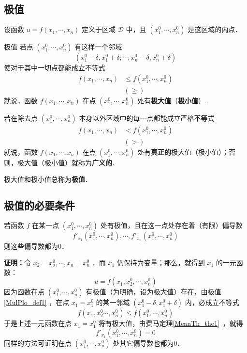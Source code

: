 

\subsection{极值}
设函数 $u=f(x_1,\cdots,x_n)$ 定义于区域 $\mathcal{D}$ 中，且 $(x_1^0,\cdots,x_n^0)$ 是这区域的内点．

\begin{definition}{极值}\label{MulPlo_def1}
若点 $(x_1^0,\cdots,x_n^0)$ 有这样一个邻域
\[(x_1^0-\delta,x_1^0+\delta;\cdots;x_n^0-\delta,x_n^0+\delta)\]
使对于其中一切点都能成立不等式
\begin{equation}
\begin{aligned}
f(x_1,\cdots,x_n)&\leq f(x_1^0,\cdots,x_n^0)\\
&(\geq)
\end{aligned}
\end{equation}
就说，函数 $f(x_1,\cdots,x_n)$ 在点 $(x_1^0,\cdots,x_n^0)$ 处有\textbf{极大值}（\textbf{极小值}）.

若在除去点 $(x_1^0,\cdots,x_n^0)$ 本身以外区域中的每一点都能成立严格不等式
\begin{equation}
\begin{aligned}
f(x_1,\cdots,x_n)&< f(x_1^0,\cdots,x_n^0)\\
&(>)
\end{aligned}
\end{equation}
就说，函数 $f(x_1,\cdots,x_n)$ 在点 $(x_1^0,\cdots,x_n^0)$ 处有\textbf{真正的}极大值（极小值）；否则，极大值（极小值）就称为\textbf{广义的}．

极大值和极小值总称为\textbf{极值}．
\end{definition}
\subsection{极值的必要条件}
\begin{theorem}{}
若函数 $f$ 在某一点 $(x_1^0,\cdots,x_n^0)$ 处有极值，且在这一点处存在着（有限）偏导数
\[f'_{x_1}(x_1^0,\cdots,x_n^0),\cdots,f'_{x_n}(x_1^0,\cdots,x_n^0)\]
则这些偏导数都为0．
\end{theorem}
\textbf{证明：}令 $x_2=x_2^0,\cdots,x_n=x_n^0$ ，而 $x_1$ 仍保持为变量；那么，就得到 $x_1$ 的一元函数：
\begin{equation}
u=f(x_1,x_2^0,\cdots,x_n^0)
\end{equation}
因为函数在点 $(x_1^0,\cdots,x_n^0)$ 有极值（为明确，设为极大值）存在，由极值\autoref{MulPlo_def1} ，在点 $x_1=x_1^0$ 的某一邻域 $(x_1^0-\delta,x_1^0+\delta)$ 内，必成立不等式
\begin{equation}
f(x_1,x_2^0\cdots,x_n^0)\leq f(x_1^0,\cdots,x_n^0)
\end{equation}
于是上述一元函数在点 $x_1=x_1^0$ 将有极大值，由费马定理\autoref{MeanTh_the1}~，就得
\begin{equation}
f'_{x_1}(x_1^0,\cdots,x_n^0)=0
\end{equation}
同样的方法可证明在点 $(x_1^0,\cdots,x_n^0)$ 处其它偏导数也都为0．

